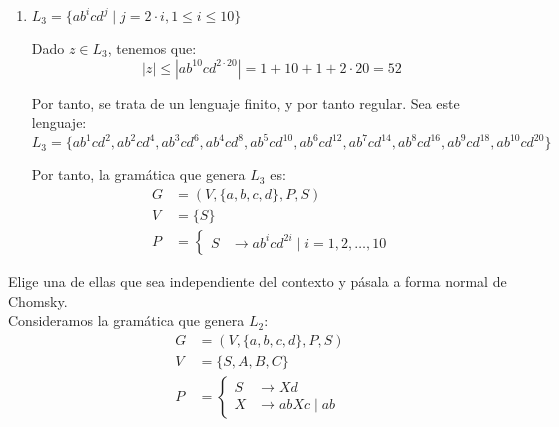 \begin{ejercicio}
\begin{enumerate}
        \item $L_3 = \{ ab^i cd^j \mid j = 2 \cdot i, 1 \leq i \leq 10 \}$
        
        Dado $z\in L_3$, tenemos que:
        \begin{equation*}
            |z|\leq |ab^{10}cd^{2\cdot 20}|=1+10+1+2\cdot 20=52
        \end{equation*}

        Por tanto, se trata de un lenguaje finito, y por tanto regular. Sea este lenguaje:
        \begin{equation*}
            L_3=\{ab^1cd^2, ab^2cd^4, ab^3cd^6, ab^4cd^8, ab^5cd^{10}, ab^6cd^{12}, ab^7cd^{14}, ab^8cd^{16}, ab^9cd^{18}, ab^{10}cd^{20}\}
        \end{equation*}

        Por tanto, la gramática que genera $L_3$ es:
        \begin{equation*}
            \begin{aligned}
                G &= (V,\{a,b,c,d\},P,S) \\
                V &= \{ S \} \\
                P &= \left\{
                    \begin{aligned}
                        S &\rightarrow ab^icd^{2i} \mid i=1,2,\ldots,10
                    \end{aligned}
                \right.
            \end{aligned}
        \end{equation*}
    \end{enumerate}
    Elige una de ellas que sea independiente del contexto y pásala a forma normal de Chomsky.\\

    Consideramos la gramática que genera $L_2$:
    \begin{equation*}
        \begin{aligned}
            G &= (V,\{a,b,c,d\},P,S) \\
            V &= \{ S, A, B, C \} \\
            P &= \left\{
                \begin{aligned}
                    S &\rightarrow Xd\\
                    X &\rightarrow abXc \mid ab
                \end{aligned}
            \right.
        \end{aligned}
    \end{equation*}


\end{ejercicio}
